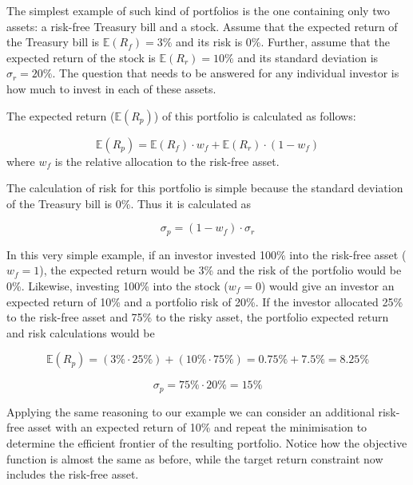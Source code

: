 The simplest example of such kind of portfolios is the one containing only two assets: a risk-free Treasury bill and a stock. Assume that the expected return of the Treasury bill is \(\mathbb{E}(R_f)=3\%\) and its risk is 0\%. Further, assume that the expected return of the stock is \(\mathbb{E}(R_r)=10\%\) and its standard deviation is \(\sigma_r=20\%\). The question that needs to be answered
for any individual investor is how much to invest in each of these
assets.

The expected return (\(\mathbb{E}(R_p)\)) of this portfolio is calculated as follows:

\[ \mathbb{E}(R_p) = \mathbb{E}(R_f)\cdot w_f + \mathbb{E}(R_r)\cdot (1- w_f) \]
where \(w_f\) is the relative allocation to the risk-free asset.

The calculation of risk for this portfolio is simple because the
standard deviation of the Treasury bill is 0\%. Thus it is calculated
as

\[ \sigma_p = (1-w_f)\cdot \sigma_r \]

In this very simple example, if an investor invested 100\% into
the risk-free asset (\(w_f=1\)), the expected return would be 3\% and
the risk of the portfolio would be 0\%. Likewise, investing 100\% into
the stock (\(w_f=0\)) would give an investor an expected return of 10\%
and a portfolio risk of 20\%. If the investor allocated 25\% to the
risk-free asset and 75\% to the risky asset, the portfolio expected
return and risk calculations would be

\[ \mathbb{E}(R_p) = (3\% \cdot 25\%) + (10\% \cdot 75\%) = 0.75\% + 7.5\% = 8.25\% \]

\[ \sigma_p = 75\% \cdot 20\% = 15\% \]

Applying the same reasoning to our example we can consider an additional
risk-free asset with an expected return of 10\% and repeat the
minimisation to determine the efficient frontier of the resulting
portfolio. Notice how the objective function is almost the same as before, 
while the target return constraint now includes the risk-free asset.

